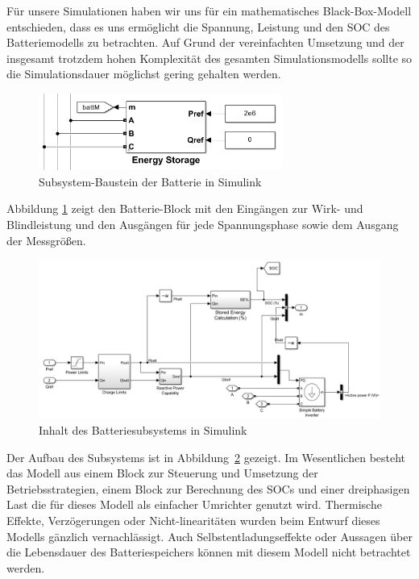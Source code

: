 Für unsere Simulationen haben wir uns für ein mathematisches Black-Box-Modell entschieden, dass es uns ermöglicht
die Spannung, Leistung und den SOC des Batteriemodells zu betrachten.
Auf Grund der vereinfachten Umsetzung und der insgesamt trotzdem hohen Komplexität des gesamten Simulationsmodells
sollte so die Simulationsdauer möglichst gering gehalten werden.

\begin{figure}[h!]
    \centering
    \includegraphics[width=8cm]{Abbildungen/BatterieBlackBox.png}
    \caption{Subsystem-Baustein der Batterie in Simulink}\label{BatModell}
\end{figure}
Abbildung \ref{BatModell} zeigt den Batterie-Block mit den Eingängen zur Wirk- und Blindleistung und den 
Ausgängen für jede Spannungsphase sowie dem Ausgang der Messgrößen.

\begin{figure}[h!]
    \centering
    \includegraphics[width=14cm]{Abbildungen/Speicher Ebene1.png}
    \caption{Inhalt des Batteriesubsystems in Simulink}\label{BatModell1}
\end{figure}

Der Aufbau des Subsystems ist in Abbildung~\ref{BatModell1} gezeigt.
Im Wesentlichen besteht das Modell aus einem Block zur Steuerung und Umsetzung der Betriebsstrategien, einem Block
zur Berechnung des SOCs und einer dreiphasigen Last die für dieses Modell als einfacher Umrichter genutzt wird.
Thermische Effekte, Verzögerungen oder Nicht-linearitäten wurden beim Entwurf dieses Modells gänzlich vernachlässigt.
Auch Selbstentladungseffekte oder Aussagen über die Lebensdauer des Batteriespeichers können mit diesem Modell nicht 
betrachtet werden.

